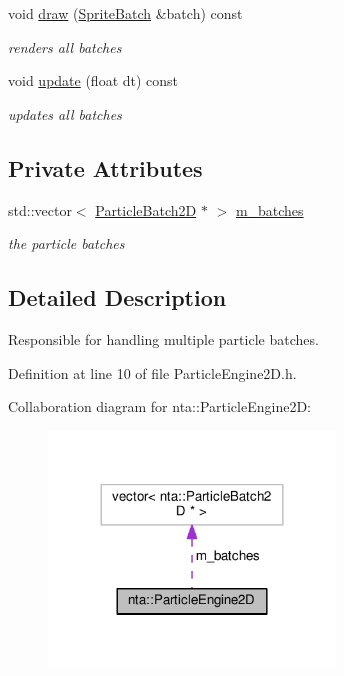 \begin{DoxyCompactItemize}
void \hyperlink{classnta_1_1ParticleEngine2D_a759937cf45e74162ce85269ddf59237b}{draw} (\hyperlink{classnta_1_1SpriteBatch}{Sprite\+Batch} \&batch) const
\begin{DoxyCompactList}\small\item\em renders all batches \end{DoxyCompactList}\item 
\mbox{\label{classnta_1_1ParticleEngine2D_ad9c7f1be65505d86c23f5754e5fd9430}} 
void \hyperlink{classnta_1_1ParticleEngine2D_ad9c7f1be65505d86c23f5754e5fd9430}{update} (float dt) const
\begin{DoxyCompactList}\small\item\em updates all batches \end{DoxyCompactList}\end{DoxyCompactItemize}
\subsection*{Private Attributes}
\begin{DoxyCompactItemize}
\item 
\mbox{\label{classnta_1_1ParticleEngine2D_a7d928b070dbc09e68d13fd7f9d087549}} 
std\+::vector$<$ \hyperlink{classnta_1_1ParticleBatch2D}{Particle\+Batch2D} $\ast$ $>$ \hyperlink{classnta_1_1ParticleEngine2D_a7d928b070dbc09e68d13fd7f9d087549}{m\+\_\+batches}
\begin{DoxyCompactList}\small\item\em the particle batches \end{DoxyCompactList}\end{DoxyCompactItemize}


\subsection{Detailed Description}
Responsible for handling multiple particle batches. 

Definition at line 10 of file Particle\+Engine2\+D.\+h.



Collaboration diagram for nta\+:\+:Particle\+Engine2D\+:\nopagebreak
\begin{figure}[H]
\begin{center}
\leavevmode
\includegraphics[width=216pt]{db/dbd/classnta_1_1ParticleEngine2D__coll__graph}
\end{center}
\end{figure}


